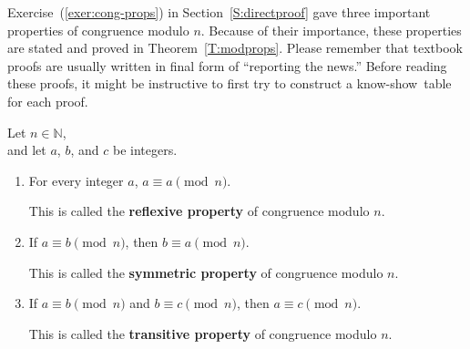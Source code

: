 \newpar
Exercise~(\ref{exer:cong-props}) in Section~\ref{S:directproof} gave three important properties of congruence modulo  $n$. Because of their importance, these properties are stated and proved in Theorem~\ref{T:modprops}.  Please remember that textbook proofs are usually written in final form of ``reporting the news.''  Before reading these proofs, it might be instructive to first try to construct a know-show~table for each proof.
%
\setcounter{equation}{0}
\begin{theorem} \label{T:modprops}
Let  $n \in \mathbb{N}$, \\and let  $a$, $b$, and  $c$  be integers.
\begin{enumerate}
  \item For every integer  $a$,  $a \equiv a \pmod n$.

This is called the \textbf{reflexive property}
%
 of congruence modulo $n$.

  \item If  $a \equiv b \pmod n$, then  $b \equiv a \pmod n$.

This is called the \textbf{symmetric property}
%
 of congruence modulo $n$.

  \item If  $a \equiv b \pmod n$ and $b \equiv c \pmod n$, then  
$a \equiv c \pmod n$.

This is called the \textbf{transitive property}
%
 of congruence modulo $n$.

\end{enumerate}
\end{theorem}
%

